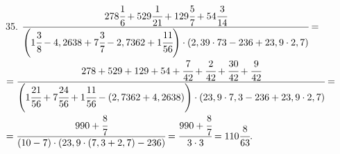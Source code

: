 35. $\cfrac{278\cfrac{1}{6}+529\cfrac{1}{21}+129\cfrac{5}{7}+54\cfrac{3}{14}}{\left(1\cfrac{3}{8}-4,2638+7\cfrac{3}{7}-2,7362+1\cfrac{11}{56}\right)\cdot(2,39\cdot73-236+23,9\cdot2,7)}=$\\$=
\cfrac{278+529+129+54+\cfrac{7}{42}+\cfrac{2}{42}+\cfrac{30}{42}+\cfrac{9}{42}}{\left(1\cfrac{21}{56}+7\cfrac{24}{56}+1\cfrac{11}{56}-(2,7362+4,2638)\right)\cdot(23,9\cdot7,3-236+23,9\cdot2,7)}=$\\$=
\cfrac{990+\cfrac{8}{7}}{\left(10-7\right)\cdot(23,9\cdot(7,3+2,7)-236)}=\cfrac{990+\cfrac{8}{7}}{3\cdot3}=110\cfrac{8}{63}.$\\
